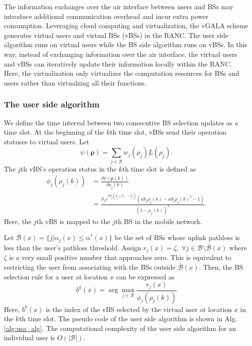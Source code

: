 \documentclass[journal]{IEEEtran}
\theoremstyle{definition}
\begin{document}
The information exchanges over the air interface between users and BSs may introduce additional communication overhead and incur extra power consumption. Leveraging cloud computing and virtualization, the vGALA scheme generates virtual users and virtual BSs (vBSs) in the RANC. The user side algorithm runs on virtual users while the BS side algorithm runs on vBSs. In this way, instead of exchanging information over the air interface, the virtual users and vBSs can iteratively update their information locally within the RANC. Here, the virtualization only virtualizes the computation resources for BSs and users rather than virtualzing all their functions.

\subsubsection{The user side algorithm}
We define the time interval between two consecutive BS selection updates as a time slot. At the beginning of the $k$th time slot, vBSs send their operation statuses to virtual users. Let
\begin{equation}
\psi(\boldsymbol{\rho})=\sum_{j \in \mathcal{B}}w_{j}(\rho_{j})L(\rho_{j}).
\end{equation}
The $j$th vBS's operation status in the $k$th time slot is defined as
\begin{align}
\label{eq:user_ass_message}
\phi_{j}(\rho_{j}(k))&=\frac{\partial \psi(\boldsymbol{\rho}(k))}{\partial {\rho}_{j}(k)}\nonumber\\
&=\frac{\vartheta_{j}e^{\kappa\theta_{j}(\rho_{j}(k)-\hat{\rho}_{j})}(\kappa\theta_{j}\rho_{j}(k)-\kappa\theta_{j}\rho_{j}(k)^{2}-1)}{(1-\rho_{j}(k))^2}.
\end{align}
Here, the $j$th vBS is mapped to the $j$th BS in the mobile network.

Let $\bar{\mathcal{B}}(x)=\{j|\alpha_{j}(x)\leq\alpha^{*}(x)\}$ be the set of BSs whose uplink pathloss is less than the user's pathloss threshold. Assign $r_{j}(x)=\zeta, \;\forall j\in\mathcal{B}\setminus\bar{\mathcal{B}}(x)$ where $\zeta$ is a very small positive number that approaches zero. This is equivalent to restricting the user from associating with the BSs outside $\bar{\mathcal{B}}(x)$.
Then, the BS selection rule for a user at location $x$ can be expressed as
\begin{equation}
\label{eq:bs_selection}
b^{k}(x)= \arg\max_{j \in \mathcal{B}}\frac{r_{j}(x)}{\phi_{j}(\rho_{j}(k))}
\end{equation}
Here, $b^{k}(x)$ is the index of the vBS selected by the virtual user at location $x$ in the $k$th time slot.
The pseudo code of the user side algorithm is shown in Alg. \ref{alg:usa_alg}. The computational complexity of the user side algorithm for an individual user is $O(|\mathcal{B}|)$.
\end{document}
